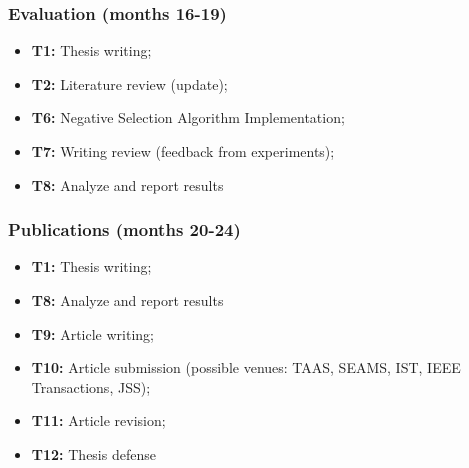 \subsubsection{Evaluation (months 16-19)}
\begin{itemize}
	\item \textbf{T1:} Thesis writing;
	\item \textbf{T2:} Literature review (update);
	\item \textbf{T6:} Negative Selection Algorithm Implementation;
	\item \textbf{T7:} Writing review (feedback from experiments);
	\item \textbf{T8:} Analyze and report results
\end{itemize}

\subsubsection{Publications (months 20-24)}
\begin{itemize}
	\item \textbf{T1:} Thesis writing;
	\item \textbf{T8:} Analyze and report results
	\item \textbf{T9:} Article writing;
	\item \textbf{T10:} Article submission (possible venues: TAAS, SEAMS, IST, IEEE Transactions, JSS);
	\item \textbf{T11:} Article revision;
	\item \textbf{T12:} Thesis defense
	
\end{itemize}

